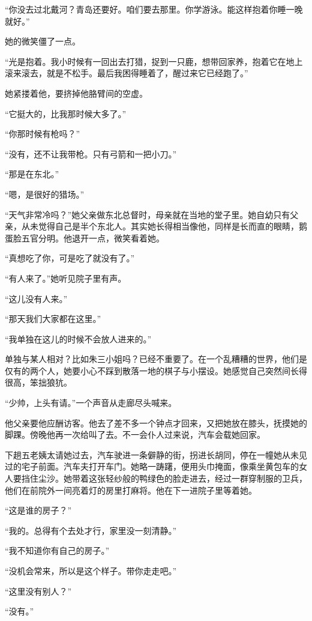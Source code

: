 \par “你没去过北戴河？青岛还要好。咱们要去那里。你学游泳。能这样抱着你睡一晚就好。”
\par 她的微笑僵了一点。
\par “光是抱着。我小时候有一回出去打猎，捉到一只鹿，想带回家养，抱着它在地上滚来滚去，就是不松手。最后我困得睡着了，醒过来它已经跑了。”
\par 她紧搂着他，要挤掉他胳臂间的空虚。
\par “它挺大的，比我那时候大多了。”
\par “你那时候有枪吗？”
\par “没有，还不让我带枪。只有弓箭和一把小刀。”
\par “那是在东北。”
\par “嗯，是很好的猎场。”
\par “天气非常冷吗？”她父亲做东北总督时，母亲就在当地的堂子里。她自幼只有父亲，从未觉得自己是半个东北人。其实她长得相当像他，同样是长而直的眼睛，鹅蛋脸五官分明。他退开一点，微笑看着她。
\par “真想吃了你，可是吃了就没有了。”
\par “有人来了。”她听见院子里有声。
\par “这儿没有人来。”
\par “那天我们大家都在这里。”
\par “我单独在这儿的时候不会放人进来的。”
\par 单独与某人相对？比如朱三小姐吗？已经不重要了。在一个乱糟糟的世界，他们是仅有的两个人，她要小心不踩到散落一地的棋子与小摆设。她感觉自己突然间长得很高，笨拙狼犺。
\par “少帅，上头有请。”一个声音从走廊尽头喊来。
\par 他父亲要他应酬访客。他去了差不多一个钟点才回来，又把她放在膝头，抚摸她的脚踝。傍晚他再一次给叫了去。不一会仆人过来说，汽车会载她回家。
\par 下趟五老姨太请她过去，汽车驶进一条僻静的街，拐进长胡同，停在一幢她从未见过的宅子前面。汽车夫打开车门。她略一踌躇，便用头巾掩面，像乘坐黄包车的女人要挡住尘沙。她带着这张轻纱般的鸭绿色的脸走进去，经过一群穿制服的卫兵，他们在前院外一间亮着灯的房里打麻将。他在下一进院子里等着她。
\par “这是谁的房子？”
\par “我的。总得有个去处才行，家里没一刻清静。”
\par “我不知道你有自己的房子。”
\par “没机会常来，所以是这个样子。带你走走吧。”
\par “这里没有别人？”
\par “没有。”
